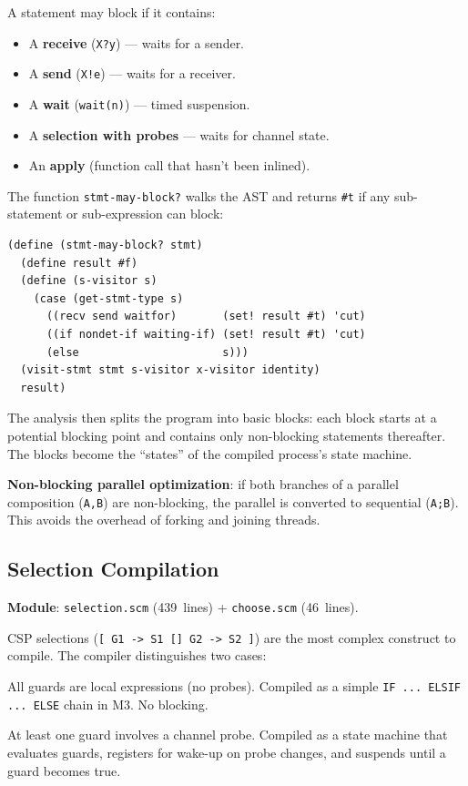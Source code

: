 \documentclass[11pt,letterpaper]{article}
\begin{document}
A statement may block if it contains:
\begin{itemize}[nosep]
  \item A \textbf{receive} (\texttt{X?y}) --- waits for a sender.
  \item A \textbf{send} (\texttt{X!e}) --- waits for a receiver.
  \item A \textbf{wait} (\texttt{wait(n)}) --- timed suspension.
  \item A \textbf{selection with probes} --- waits for channel state.
  \item An \textbf{apply} (function call that hasn't been inlined).
\end{itemize}

The function \texttt{stmt-may-block?} walks the AST and returns
\texttt{\#t} if any sub-statement or sub-expression can block:

\begin{lstlisting}
(define (stmt-may-block? stmt)
  (define result #f)
  (define (s-visitor s)
    (case (get-stmt-type s)
      ((recv send waitfor)       (set! result #t) 'cut)
      ((if nondet-if waiting-if) (set! result #t) 'cut)
      (else                      s)))
  (visit-stmt stmt s-visitor x-visitor identity)
  result)
\end{lstlisting}

The analysis then splits the program into basic blocks: each block
starts at a potential blocking point and contains only non-blocking
statements thereafter.  The blocks become the ``states'' of the
compiled process's state machine.

\textbf{Non-blocking parallel optimization}: if both branches of a
parallel composition (\texttt{A,B}) are non-blocking, the parallel
is converted to sequential (\texttt{A;B}).  This avoids the overhead
of forking and joining threads.

\subsection{Selection Compilation}
\label{sec:selection}

\textbf{Module}: \texttt{selection.scm} (439~lines) +
\texttt{choose.scm} (46~lines).

CSP selections (\texttt{[~G1 -> S1 [] G2 -> S2~]}) are the most
complex construct to compile.  The compiler distinguishes two cases:

\begin{description}[style=nextline]
  \item[Local selection]
    All guards are local expressions (no probes).  Compiled as a
    simple \texttt{IF ... ELSIF ... ELSE} chain in M3.  No blocking.

  \item[Waiting selection]
    At least one guard involves a channel probe.  Compiled as a
    state machine that evaluates guards, registers for wake-up on
    probe changes, and suspends until a guard becomes true.
\end{description}
\end{document}
